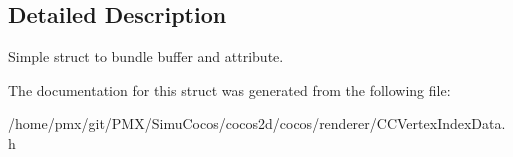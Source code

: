 \subsection{Detailed Description}
Simple struct to bundle buffer and attribute. 

The documentation for this struct was generated from the following file\+:\begin{DoxyCompactItemize}
\item 
/home/pmx/git/\+P\+M\+X/\+Simu\+Cocos/cocos2d/cocos/renderer/C\+C\+Vertex\+Index\+Data.\+h\end{DoxyCompactItemize}
